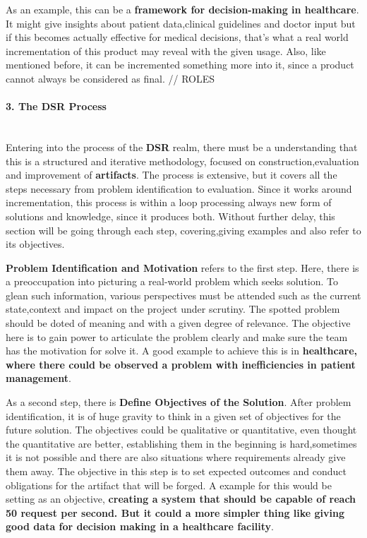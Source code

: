As an example, this can be a \textbf{framework for decision-making in healthcare}. It might give insights about patient data,clinical guidelines and doctor input but if this becomes actually effective for medical decisions, that's what a real world incrementation of this product may reveal with the given usage. Also, like mentioned before, it can be incremented something more into it, since a product cannot always be considered as final.
// ROLES

\paragraph{3. The DSR Process}\mbox{}\\
Entering into the process of the \textbf{DSR} realm, there must be a understanding that this is a structured and iterative methodology, focused on construction,evaluation and improvement of \textbf{artifacts}. The process is extensive, but it covers all the steps necessary from problem identification to evaluation. Since it works around incrementation, this process is within a loop processing always new form of solutions and knowledge, since it produces both.
Without further delay, this section will be going through each step, covering,giving examples and also refer to its objectives. 

\textbf{Problem Identification and Motivation} refers to the first step. Here, there is a preoccupation into picturing a real-world problem which seeks solution. To glean such information, various perspectives must be attended such as the current state,context and impact on the project under scrutiny. The spotted problem should be doted of meaning and with a given degree of relevance. The objective here is to gain power to articulate the problem clearly and make sure the team has the motivation for solve it. A good example to achieve this is in \textbf{healthcare, where there could be observed a problem with inefficiencies in patient management}.

As a second step, there is \textbf{Define Objectives of the Solution}. After problem identification, it is of huge gravity to think in a given set of objectives for the future solution. The objectives could be qualitative or quantitative, even thought the quantitative are better, establishing them in the beginning is hard,sometimes it is not possible and there are also situations where requirements already give them away. The objective in this step is to set expected outcomes and conduct obligations for the artifact that will be forged. A example for this would be setting as an objective, \textbf{creating a system that should be capable of reach 50 request per second. But it could a more simpler thing like giving good data for decision making in a healthcare facility}.

